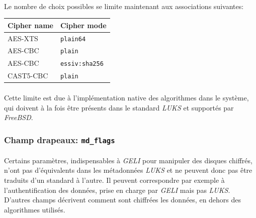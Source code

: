 \paragraph{}
Le nombre de choix possibles se limite maintenant aux associations suivantes:
\begin{center}
  \begin{tabular}{ | l | l | }
    \hline
    \textbf{Cipher name} & \textbf{Cipher mode}  \\
    \hline
    AES-XTS              & \texttt{plain64}      \\
    AES-CBC              & \texttt{plain}        \\
    AES-CBC              & \texttt{essiv:sha256} \\
    CAST5-CBC            & \texttt{plain}        \\
    \hline
  \end{tabular}
\end{center}
\paragraph{}
Cette limite est due à l'implémentation native des algorithmes dans le système,
qui doivent à la fois être présents dans le standard \textit{LUKS} et supportés
par \textit{FreeBSD}.


\subsubsection{Champ drapeaux: \texttt{md\_flags}}
\paragraph{}
Certains paramètres, indispensables à \textit{GELI} pour manipuler des disques
chiffrés, n'ont pas d'équivalents dans les métadonnées \textit{LUKS} et ne
peuvent donc pas être traduits d'un standard à l'autre. Il peuvent correspondre
par exemple à l'authentification des données, prise en charge par \textit{GELI}
mais pas \textit{LUKS}. D'autres champs décrivent comment sont chiffrées les
données, en dehors des algorithmes utilisés.
